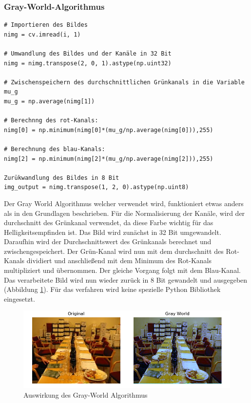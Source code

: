\documentclass[a4paper,12pt,oneside]{article}
\begin{document}
\subsubsection{Gray-World-Algorithmus}
\begin{lstlisting}
# Importieren des Bildes
nimg = cv.imread(i, 1)

# Umwandlung des Bildes und der Kanäle in 32 Bit
nimg = nimg.transpose(2, 0, 1).astype(np.uint32)

# Zwischenspeichern des durchschnittlichen Grünkanals in die Variable mu_g
mu_g = np.average(nimg[1])

# Berechnng des rot-Kanals: 
nimg[0] = np.minimum(nimg[0]*(mu_g/np.average(nimg[0])),255)

# Berechnung des blau-Kanals:
nimg[2] = np.minimum(nimg[2]*(mu_g/np.average(nimg[2])),255)

Zurükwandlung des Bildes in 8 Bit
img_output = nimg.transpose(1, 2, 0).astype(np.uint8)
\end{lstlisting}
Der Gray World Algorithmus \cite{gray2012world} welcher verwendet wird, funktioniert etwas anders als in den Grundlagen beschrieben. Für die Normalisierung der Kanäle, wird der durchschnitt des Grünkanal verwendet, da diese Farbe wichtig für das Helligkeitsempfinden ist. Das Bild wird zunächst in 32 Bit umgewandelt. Daraufhin wird  der Durchschnittswert des Grünkanals berechnet und zwischengespeichert. Der Grün-Kanal wird nun mit dem durchschnitt des Rot-Kanals dividiert und anschließend mit dem Minimum des Rot-Kanals multipliziert und übernommen. Der gleiche Vorgang folgt mit dem Blau-Kanal. Das verarbeitete Bild wird nun wieder zurück in 8 Bit gewandelt und ausgegeben (Abbildung \ref{img:gwnimg}). Für das verfahren wird keine spezielle Python Bibliothek eingesetzt. 
\begin{figure}
	[h]
	\centering
	\includegraphics[scale=0.7]{Sources/gwn.png}
	\caption{Auswirkung des Gray-World Algorithmus}
	\label{img:gwnimg}
\end{figure}
\end{document}
